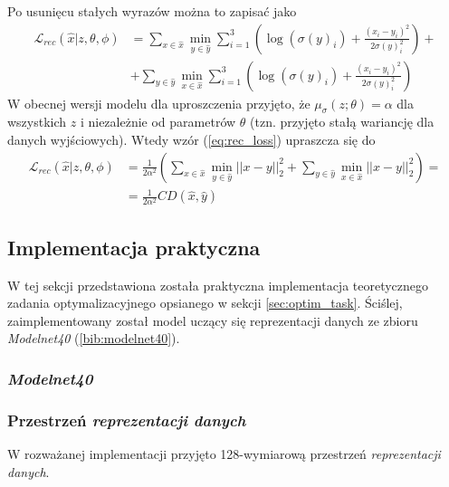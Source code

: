\documentclass[12pt]{extarticle}
\begin{document}
Po usunięcu stałych wyrazów można to zapisać jako
\begin{equation}
\begin{split}
\mathcal{L}_{rec}(\hat{x}|z,\theta,\phi) &= \sum_{x \in \hat{x}} \min_{y \in \hat{y}} \sum_{i=1}^3
\left( \log(\sigma(y)_i) + \frac{(x_i-y_i)^2}{2\sigma(y)_i^2} \right) +\\
&+ \sum_{y \in \hat{y}} \min_{x \in \hat{x}} \sum_{i=1}^3
\left( \log(\sigma(y)_i) + \frac{(x_i-y_i)^2}{2\sigma(y)_i^2} \right)
\end{split}
\label{eq:rec_loss}
\end{equation}
W obecnej wersji modelu dla uproszczenia przyjęto, że $\mu_\sigma(z;\theta) = \alpha$
dla wszystkich $z$ i niezależnie od parametrów $\theta$ (tzn. przyjęto stałą wariancję dla
danych wyjściowych). Wtedy wzór (\ref{eq:rec_loss}) upraszcza się do
\begin{equation}
\begin{split}
\mathcal{L}_{rec}(\hat{x}|z,\theta,\phi) &= \frac{1}{2\alpha^2} \left(
\sum_{x \in \hat{x}} \min_{y \in \hat{y}} ||x-y||_2^2 +
\sum_{y \in \hat{y}} \min_{x \in \hat{x}} ||x-y||_2^2 \right) = \\
&= \frac{1}{2\alpha^2} CD(\hat{x}, \hat{y})
\end{split}
\end{equation}

\subsection{Implementacja praktyczna}
W tej sekcji przedstawiona została praktyczna implementacja teoretycznego zadania optymalizacyjnego
opsianego w sekcji \ref{sec:optim_task}. Ściślej, zaimplementowany został model uczący się reprezentacji
danych ze zbioru \textit{Modelnet40} (\ref{bib:modelnet40}).

\subsubsection{\textit{Modelnet40}}

\subsubsection{Przestrzeń \textit{reprezentacji danych}}
W rozważanej implementacji przyjęto 128-wymiarową przestrzeń \textit{reprezentacji danych}.
\end{document}
